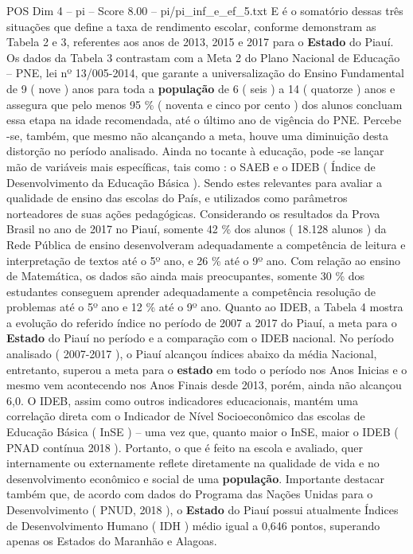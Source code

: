 \begin{textsample}{POS Dim 4 – pi – Score 8.00 – pi/pi\_inf\_e\_ef\_5.txt}
E é o somatório dessas três situações que define a taxa de rendimento escolar, conforme demonstram as Tabela 2 e 3, referentes aos anos de 2013, 2015 e 2017 para o \textbf{Estado} do Piauí.
Os dados da Tabela 3 contrastam com a Meta 2 do Plano Nacional de Educação – PNE, lei nº 13/005-2014, que garante a universalização do Ensino Fundamental de 9 ( nove ) anos para toda a \textbf{população} de 6 ( seis ) a 14 ( quatorze ) anos e assegura que pelo menos 95 \% ( noventa e cinco por cento ) dos alunos concluam essa etapa na idade recomendada, até o último ano de vigência do PNE.
Percebe -se, também, que mesmo não alcançando a meta, houve uma diminuição desta distorção no período analisado.
Ainda no tocante à educação, pode -se lançar mão de variáveis mais específicas, tais como : o SAEB e o IDEB ( Índice de Desenvolvimento da Educação Básica ).
Sendo estes relevantes para avaliar a qualidade de ensino das escolas do País, e utilizados como parâmetros norteadores de suas ações pedagógicas.
Considerando os resultados da Prova Brasil no ano de 2017 no Piauí, somente 42 \% dos alunos ( 18.128 alunos ) da Rede Pública de ensino desenvolveram adequadamente a competência de leitura e interpretação de textos até o 5º ano, e 26 \% até o 9º ano.
Com relação ao ensino de Matemática, os dados são ainda mais preocupantes, somente 30 \% dos estudantes conseguem aprender adequadamente a competência resolução de problemas até o 5º ano e 12 \% até o 9º ano.
Quanto ao IDEB, a Tabela 4 mostra a evolução do referido índice no período de 2007 a 2017 do Piauí, a meta para o \textbf{Estado} do Piauí no período e a comparação com o IDEB nacional.
No período analisado ( 2007-2017 ), o Piauí alcançou índices abaixo da média Nacional, entretanto, superou a meta para o \textbf{estado} em todo o período nos Anos Inicias e o mesmo vem acontecendo nos Anos Finais desde 2013, porém, ainda não alcançou 6,0.
O IDEB, assim como outros indicadores educacionais, mantém uma correlação direta com o Indicador de Nível Socioeconômico das escolas de Educação Básica ( InSE ) – uma vez que, quanto maior o InSE, maior o IDEB ( PNAD contínua 2018 ).
Portanto, o que é feito na escola e avaliado, quer internamente ou externamente reflete diretamente na qualidade de vida e no desenvolvimento econômico e social de uma \textbf{população}.
Importante destacar também que, de acordo com dados do Programa das Nações Unidas para o Desenvolvimento ( PNUD, 2018 ), o \textbf{Estado} do Piauí possui atualmente Índices de Desenvolvimento Humano ( IDH ) médio igual a 0,646 pontos, superando apenas os Estados do Maranhão e Alagoas.

\end{textsample}
